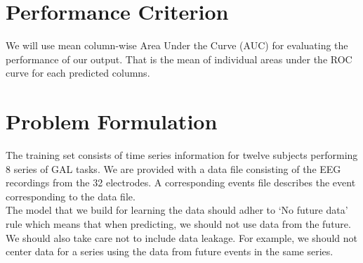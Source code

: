 \documentclass[final,leqno,onefignum,onetabnum]{siamltexmm}
\begin{document}
\section{Performance Criterion}
We will use mean column-wise Area Under the Curve (AUC) for evaluating the performance of our output.  That is the mean of individual areas under the ROC curve for each predicted columns.

\section{Problem Formulation}
The training set consists of time series information for twelve subjects performing 8 series of GAL tasks.  We are provided with a data file consisting of the EEG recordings from the 32 electrodes.  A corresponding events file describes the event corresponding to the data file.\\
The model that we build for learning the data should adher to `No future data' rule\cite{kaggledata} which means that when predicting, we should not use data from the future.  We should also take care not to include data leakage.  For example, we should not center data for a series using the data from future events in the same series.
\end{document}
